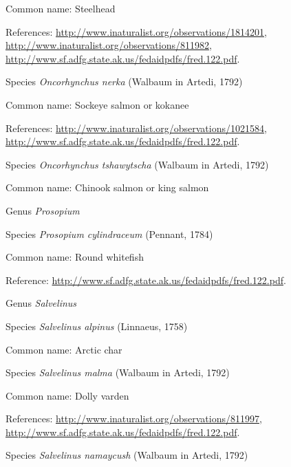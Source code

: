 \documentclass[9pt, article]{memoir}
\begin{document}
\begin{multicols}{2}
Common name: Steelhead

References: 
\url{http://www.inaturalist.org/observations/1814201}, 
\url{http://www.inaturalist.org/observations/811982}, 
\url{http://www.sf.adfg.state.ak.us/fedaidpdfs/fred.122.pdf}.

\vspace{6pt}\noindent\hspace{36pt}Species \textit{Oncorhynchus nerka} (Walbaum in Artedi, 1792)


Common name: Sockeye salmon or kokanee

References: 
\url{http://www.inaturalist.org/observations/1021584}, 
\url{http://www.sf.adfg.state.ak.us/fedaidpdfs/fred.122.pdf}.

\vspace{6pt}\noindent\hspace{36pt}Species \textit{Oncorhynchus tshawytscha} (Walbaum in Artedi, 1792)


Common name: Chinook salmon or king salmon

\vspace{6pt}\noindent\hspace{30pt}Genus \textit{Prosopium}


\vspace{6pt}\noindent\hspace{36pt}Species \textit{Prosopium cylindraceum} (Pennant, 1784)


Common name: Round whitefish

Reference: 
\url{http://www.sf.adfg.state.ak.us/fedaidpdfs/fred.122.pdf}.

\vspace{6pt}\noindent\hspace{30pt}Genus \textit{Salvelinus}


\vspace{6pt}\noindent\hspace{36pt}Species \textit{Salvelinus alpinus} (Linnaeus, 1758)


Common name: Arctic char

\vspace{6pt}\noindent\hspace{36pt}Species \textit{Salvelinus malma} (Walbaum in Artedi, 1792)


Common name: Dolly varden

References: 
\url{http://www.inaturalist.org/observations/811997}, 
\url{http://www.sf.adfg.state.ak.us/fedaidpdfs/fred.122.pdf}.

\vspace{6pt}\noindent\hspace{36pt}Species \textit{Salvelinus namaycush} (Walbaum in Artedi, 1792)



\end{multicols}
\end{document}
